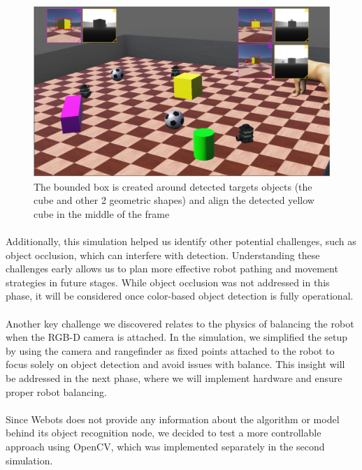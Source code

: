 \begin{figure}[H]
    \centering
    \includegraphics[width=0.8\linewidth]{assets/images/object_detection/Figure3.png}
    \caption{The bounded box is created around detected targets objects (the cube and other 2 geometric shapes) and align the detected yellow cube in the middle of the frame
}
    \label{fig:object detection figure 3.} 
\end{figure}

\paragraph*{}
Additionally, this simulation helped us identify other potential challenges, such as object occlusion, which can interfere with detection. Understanding these challenges early allows us to plan more effective robot pathing and movement strategies in future stages. While object occlusion was not addressed in this phase, it will be considered once color-based object detection is fully operational.

\paragraph*{}
Another key challenge we discovered relates to the physics of balancing the robot when the RGB-D camera is attached. In the simulation, we simplified the setup by using the camera and rangefinder as fixed points attached to the robot to focus solely on object detection and avoid issues with balance. This insight will be addressed in the next phase, where we will implement hardware and ensure proper robot balancing.

\paragraph*{}
Since Webots does not provide any information about the algorithm or model behind its object recognition node, we decided to test a more controllable approach using OpenCV, which was implemented separately in the second simulation.

